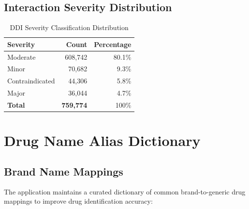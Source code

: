 \documentclass[11pt,a4paper]{article}
\begin{document}
\subsection{Interaction Severity Distribution}

\begin{table}[H]
\centering
\caption{DDI Severity Classification Distribution}
\label{tab:severity_dist}
\begin{tabular}{lrr}
\toprule
\textbf{Severity} & \textbf{Count} & \textbf{Percentage} \\
\midrule
Moderate & 608,742 & 80.1\% \\
Minor & 70,682 & 9.3\% \\
Contraindicated & 44,306 & 5.8\% \\
Major & 36,044 & 4.7\% \\
\midrule
\textbf{Total} & \textbf{759,774} & 100\% \\
\bottomrule
\end{tabular}
\end{table}

\section{Drug Name Alias Dictionary}

\subsection{Brand Name Mappings}

The application maintains a curated dictionary of common brand-to-generic drug mappings to improve drug identification accuracy:
\end{document}
